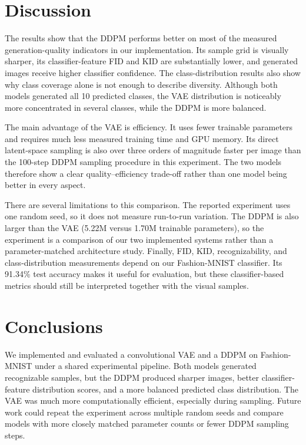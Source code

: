 \documentclass{article}
\begin{document}
\section{Discussion}
The results show that the DDPM performs better on most of the measured generation-quality indicators in our implementation. Its sample grid is visually sharper, its classifier-feature FID and KID are substantially lower, and generated images receive higher classifier confidence. The class-distribution results also show why class coverage alone is not enough to describe diversity. Although both models generated all 10 predicted classes, the VAE distribution is noticeably more concentrated in several classes, while the DDPM is more balanced.

The main advantage of the VAE is efficiency. It uses fewer trainable parameters and requires much less measured training time and GPU memory. Its direct latent-space sampling is also over three orders of magnitude faster per image than the 100-step DDPM sampling procedure in this experiment. The two models therefore show a clear quality--efficiency trade-off rather than one model being better in every aspect.

There are several limitations to this comparison. The reported experiment uses one random seed, so it does not measure run-to-run variation. The DDPM is also larger than the VAE (5.22M versus 1.70M trainable parameters), so the experiment is a comparison of our two implemented systems rather than a parameter-matched architecture study. Finally, FID, KID, recognizability, and class-distribution measurements depend on our Fashion-MNIST classifier. Its 91.34\% test accuracy makes it useful for evaluation, but these classifier-based metrics should still be interpreted together with the visual samples.

\section{Conclusions}
We implemented and evaluated a convolutional VAE and a DDPM on Fashion-MNIST under a shared experimental pipeline. Both models generated recognizable samples, but the DDPM produced sharper images, better classifier-feature distribution scores, and a more balanced predicted class distribution. The VAE was much more computationally efficient, especially during sampling. Future work could repeat the experiment across multiple random seeds and compare models with more closely matched parameter counts or fewer DDPM sampling steps.
\end{document}
